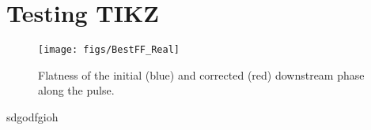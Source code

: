 \documentclass{article}
\begin{document}
\section{Testing TIKZ}

\begin{figure}
  \centering
  \texttt{[image: figs/BestFF\_Real]}
  \caption{Flatness of the initial (blue) and corrected (red) downstream phase along the pulse.}
  \label{f:BestFF_Flatness}
\end{figure}

%  

sdgodfgioh
\end{document}
